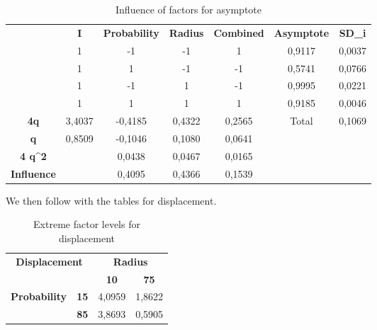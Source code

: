\begin{table}[H]
\centering
\begin{tabular}{c|c|c|c|c|cc}
\cline{2-7}
 & \textbf{I} & \textbf{Probability} & \textbf{Radius} & \textbf{Combined} & \multicolumn{1}{c|}{\textbf{Asymptote}} & \multicolumn{1}{c|}{\textbf{SD\_i}} \\ \cline{2-7} 
 & 1 & -1 & -1 & 1 & \multicolumn{1}{c|}{0,9117} & \multicolumn{1}{c|}{0,0037} \\ \cline{2-7} 
 & 1 & 1 & -1 & -1 & \multicolumn{1}{c|}{0,5741} & \multicolumn{1}{c|}{0,0766} \\ \cline{2-7} 
 & 1 & -1 & 1 & -1 & \multicolumn{1}{c|}{0,9995} & \multicolumn{1}{c|}{0,0221} \\ \cline{2-7} 
 & 1 & 1 & 1 & 1 & \multicolumn{1}{c|}{0,9185} & \multicolumn{1}{c|}{0,0046} \\ \hline
\multicolumn{1}{|c|}{\textbf{4q}} & 3,4037 & -0,4185 & 0,4322 & 0,2565 & \multicolumn{1}{c|}{Total} & \multicolumn{1}{c|}{0,1069} \\ \hline
\multicolumn{1}{|c|}{\textbf{q}} & 0,8509 & -0,1046 & 0,1080 & 0,0641 &  &  \\ \cline{1-5}
\multicolumn{1}{|c|}{\textbf{4 q\textasciicircum{}2}} &  & 0,0438 & 0,0467 & 0,0165 &  &  \\ \cline{1-5}
\multicolumn{1}{|c|}{\textbf{Influence}} &  & 0,4095 & 0,4366 & 0,1539 &  &  \\ \cline{1-5}
\end{tabular}
\caption{Influence of factors for asymptote}
\end{table}

We then follow with the tables for displacement.

\begin{table}[H]
\centering
\begin{tabular}{|cc|cc|}
\hline
\multicolumn{2}{|c|}{\multirow{2}{*}{\textbf{Displacement}}} & \multicolumn{2}{c|}{\textbf{Radius}} \\ \cline{3-4} 
\multicolumn{2}{|c|}{} & \multicolumn{1}{c|}{\textbf{10}} & \textbf{75} \\ \hline
\multicolumn{1}{|c|}{\multirow{2}{*}{\textbf{Probability}}} & \textbf{15} & \multicolumn{1}{c|}{4,0959} & 1,8622 \\ \cline{2-4} 
\multicolumn{1}{|c|}{} & \textbf{85} & \multicolumn{1}{c|}{3,8693} & 0,5905 \\ \hline
\end{tabular}
\caption{Extreme factor levels for displacement}
\end{table}

